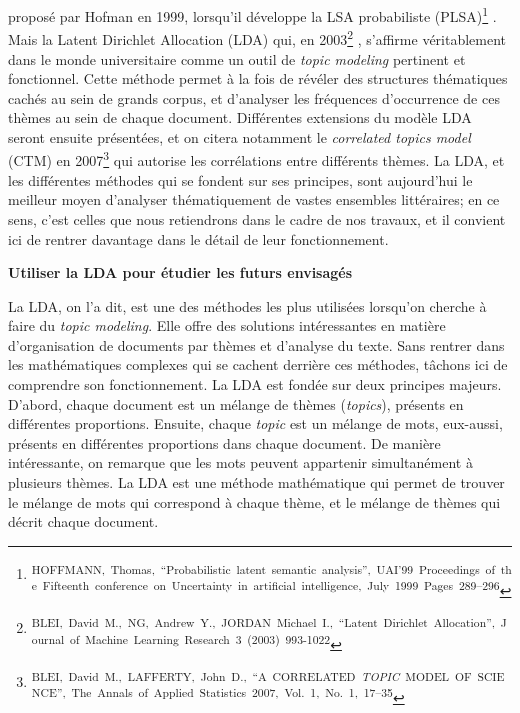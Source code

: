 \documentclass[letterpaper,portrait,12pt]{article}
\begin{document}
propos\'{e} par Hofman en 1999, lorsqu'il d\'{e}veloppe la LSA probabiliste (PLSA)\footnote{\textsuperscript{\newpage
}\textsuperscript{	HOFFMANN,\ Thomas,\ {``}Probabilistic\ latent\ semantic\ analysis'',\ UAI'99\ Proceedings\ of\ the\ Fifteenth\ conference\ on\ Uncertainty\ in\ artificial\ intelligence,\ July\ 1999\ Pages\ 289--296}} . Mais la Latent Dirichlet Allocation (LDA) qui, en 2003\footnote{\textsuperscript{\newpage
}\textsuperscript{	BLEI,\ David\ M.,\ NG,\ Andrew\ Y.,\ JORDAN\ Michael\ I.,\ {``}Latent\ Dirichlet\ Allocation'',\ Journal\ of\ Machine\ Learning\ Research\ 3\ (2003)\ 993-1022}} , s'affirme v\'{e}ritablement dans le monde universitaire comme un outil de \emph{topic modeling }pertinent et fonctionnel. Cette m\'{e}thode permet \`{a} la fois de r\'{e}v\'{e}ler des structures th\'{e}matiques cach\'{e}s au sein de grands corpus, et d'analyser les fr\'{e}quences d'occurrence de ces th\`{e}mes au sein de chaque document. Diff\'{e}rentes extensions du mod\`{e}le LDA seront ensuite pr\'{e}sent\'{e}es, et on citera notamment le \emph{correlated topics model} (CTM) en 2007\footnote{\textsuperscript{\newpage
}\textsuperscript{	BLEI,\ David\ M.,\ LAFFERTY,\ John\ D.,\ {``}A\ CORRELATED\ }\emph{\textsuperscript{TOPIC}}\textsuperscript{\ MODEL\ OF\ SCIENCE'',\ The\ Annals\ of\ Applied\ Statistics\ 2007,\ Vol.\ 1,\ No.\ 1,\ 17--35}} qui autorise les corr\'{e}lations entre diff\'{e}rents th\`{e}mes. La LDA, et les diff\'{e}rentes m\'{e}thodes qui se fondent sur ses principes, sont aujourd'hui le meilleur moyen d'analyser th\'{e}matiquement de vastes ensembles litt\'{e}raires; en ce sens, c'est celles que nous retiendrons dans le cadre de nos travaux, et il convient ici de rentrer davantage dans le d\'{e}tail de leur fonctionnement.








\textbf{	Utiliser la LDA pour \'{e}tudier les futurs envisag\'{e}s}





\textbf{	}La LDA, on l'a dit, est une des m\'{e}thodes les plus utilis\'{e}es lorsqu'on cherche \`{a} faire du \emph{topic modeling}. Elle offre des solutions int\'{e}ressantes en mati\`{e}re d'organisation de documents par th\`{e}mes et d'analyse du texte. Sans rentrer dans les math\'{e}matiques complexes qui se cachent derri\`{e}re ces m\'{e}thodes, t\^{a}chons ici de comprendre son fonctionnement. La LDA est fond\'{e}e sur deux principes majeurs. D'abord, chaque document est un m\'{e}lange de th\`{e}mes (\emph{topics}), pr\'{e}sents en diff\'{e}rentes proportions. Ensuite, chaque \emph{topic} est un m\'{e}lange de mots, eux-aussi, pr\'{e}sents en diff\'{e}rentes proportions dans chaque document. De mani\`{e}re int\'{e}ressante, on remarque que les mots peuvent appartenir simultan\'{e}ment \`{a} plusieurs th\`{e}mes. La LDA est une m\'{e}thode math\'{e}matique qui permet de trouver le m\'{e}lange de mots qui correspond \`{a} chaque th\`{e}me, et le m\'{e}lange de th\`{e}mes qui d\'{e}crit chaque document.
\end{document}
